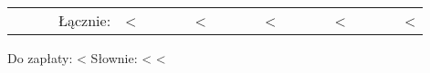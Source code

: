 \documentclass[polish]{dinbrief}
\providecommand{\tabularnewline}{\\}
\begin{document}
\begin{flushright}

\begin{tabular}{r>{\raggedleft}p{0.2\paperwidth}rr|r|r|r|r|}
 &  &  & Łącznie: & <%
{} 
 &  &  &  &         <%
{} 
 &  &  &  &         <%
{} 
 &  &  &  &         <%
{} 
 &  &  &  &         <%
{} 
\end{tabular}
\par\end{flushright}

\medskip{}



\begin{flushright}
Do zapłaty: <%
Słownie:    <%
            <%
\par\end{flushright}
\end{document}
